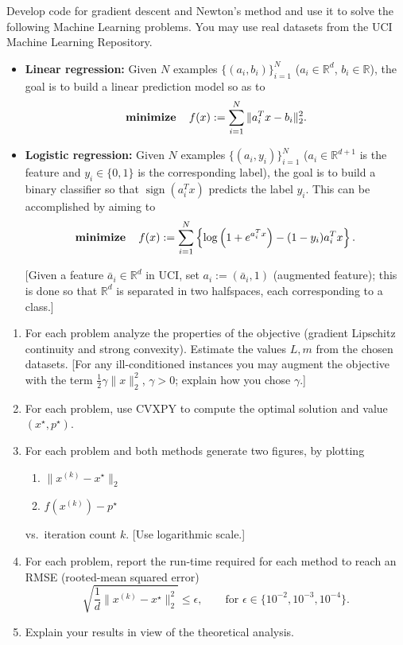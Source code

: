 \documentclass[11pt,letter,notitlepage]{article}
\DeclareMathOperator*{\minimize}{\bf minimize}
\theoremstyle{definition}
\begin{document}
\begin{exercise}
Develop code for gradient descent and Newton's method and use it to solve the following Machine Learning problems. You may use real datasets from the UCI Machine Learning Repository.

\begin{itemize}
    \item \textbf{Linear regression:} Given $N$ examples $\{(a_i,b_i)\}_{i=1}^N$ ($a_i \in \mathbb{R}^d$, $b_i \in \mathbb{R}$), the goal is to build a linear prediction model so as to
    \[
    \minimize \quad f(x) := \sum_{i=1}^N \|a_i^T x - b_i\|_2^2.
    \]

    \item \textbf{Logistic regression:} Given $N$ examples $\{(a_i,y_i)\}_{i=1}^N$ ($a_i \in \mathbb{R}^{d+1}$ is the feature and $y_i \in \{0,1\}$ is the corresponding label), the goal is to build a binary classifier so that $\operatorname{sign}(a_i^T x)$ predicts the label $y_i$. This can be accomplished by aiming to
    \[
    \minimize \quad
    f(x) := \sum_{i=1}^N
    \left\{
    \log\left(1 + e^{a_i^T x}\right) - (1-y_i)a_i^T x
    \right\}.
    \]

    [Given a feature $\bar{a}_i \in \mathbb{R}^d$ in UCI, set $a_i := (\bar{a}_i,1)$ (augmented feature); this is done so that $\mathbb{R}^d$ is separated in two halfspaces, each corresponding to a class.]
\end{itemize}

\begin{enumerate}[label=(\alph*)]
    \item For each problem analyze the properties of the objective (gradient Lipschitz continuity and strong convexity). Estimate the values $L,m$ from the chosen datasets. [For any ill-conditioned instances you may augment the objective with the term $\frac{1}{2}\gamma\|x\|_2^2$, $\gamma>0$; explain how you chose $\gamma$.]

    \item For each problem, use CVXPY to compute the optimal solution and value $(x^\star,p^\star)$.

    \item For each problem and both methods generate two figures, by plotting
    \begin{enumerate}
        \item[(i)] $\|x^{(k)} - x^\star\|_2$
        \item[(ii)] $f(x^{(k)}) - p^\star$
    \end{enumerate}
    vs.\ iteration count $k$. [Use logarithmic scale.]

    \item For each problem, report the run-time required for each method to reach an RMSE (rooted-mean squared error)
    \[
    \sqrt{\frac{1}{d}\|x^{(k)} - x^\star\|_2^2} \le \epsilon,
    \qquad \text{for } \epsilon \in \{10^{-2},10^{-3},10^{-4}\}.
    \]

    \item Explain your results in view of the theoretical analysis.
\end{enumerate}
\end{exercise}
\end{document}
